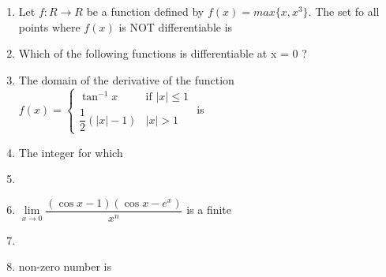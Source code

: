 \begin{enumerate}[label=\arabic*.,ref=\thesubsection.\theenumi]
\item Let $f:R\to R$ be a function defined by $f(x)=max\{x,x^3\}$. The set fo all points where $f(x)$ is NOT differentiable is
\begin{itemize}
\end{itemize}

\item Which of the following functions is differentiable at x = 0 ?
\begin{itemize}
\end{itemize}

\item The domain of the derivative of the function $f(x)\mathbin{=}\begin{cases} \tan^{-1}x & \text{if $|x|\leq 1$}\\\dfrac{1}{2}(|x|-1) & \text{$|x|>1$}\end{cases}$ is
\begin{itemize}
\end{itemize}

\item The integer for which \item[~]\item[~]$\lim\limits_{x \to 0}\dfrac{(\cos x-1)(\cos x-e^x)}{x^n}$ is a finite \item[~]\item[~]non-zero number is
\begin{itemize}
\end{itemize}


\end{enumerate}
